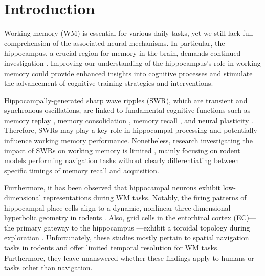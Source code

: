 \documentclass[final,3p,times,twocolumn]{elsarticle}
\begin{document}
\section{Introduction}
Working memory (WM) is essential for various daily tasks, yet we still lack full comprehension of the associated neural mechanisms. In particular, the hippocampus, a crucial region for memory in the brain, demands continued investigation \cite{scoville_loss_1957,squire_legacy_2009,boran_persistent_2019,kaminski_persistently_2017,kornblith_persistent_2017,faraut_dataset_2018,borders_hippocampus_2022,li_functional_2023,dimakopoulos_information_2022}. Improving our understanding of the hippocampus's role in working memory could provide enhanced insights into cognitive processes and stimulate the advancement of cognitive training strategies and interventions. 

\indent
Hippocampally-generated sharp wave ripples (SWR), which are transient and synchronous oscillations, are linked to fundamental cognitive functions such as memory replay \cite{wilson_reactivation_1994,nadasdy_replay_1999,lee_memory_2002,davidson_hippocampal_2009}, memory consolidation \cite{girardeau_selective_2009,ego-stengel_disruption_2010,fernandez-ruiz_long-duration_2019,kim_corticalhippocampal_2022}, memory recall \cite{wu_hippocampal_2017,norman_hippocampal_2019,norman_hippocampal_2021}, and neural plasticity \cite{behrens_induction_2005,norimoto_hippocampal_2018}. Therefore, SWRs may play a key role in hippocampal processing and potentially influence working memory performance. Nonetheless, research investigating the impact of SWRs on working memory is limited \cite{jadhav_awake_2012}, mainly focusing on rodent models performing navigation tasks without clearly differentiating between specific timings of memory recall and acquisition.

\indent
Furthermore, it has been observed that hippocampal neurons exhibit low-dimensional representations during WM tasks. Notably, the firing patterns of hippocampal place cells \cite{okeefe_hippocampus_1971,okeefe_place_1976,ekstrom_cellular_2003,kjelstrup_finite_2008,harvey_intracellular_2009,royer_control_2012} align to a dynamic, nonlinear three-dimensional hyperbolic geometry in rodents \cite{zhang_hippocampal_2022}. Also, grid cells in the entorhinal cortex (EC)—the primary gateway to the hippocampus \cite{naber_reciprocal_2001,van_strien_anatomy_2009,strange_functional_2014}—exhibit a toroidal topology during exploration \cite{gardner_toroidal_2022}. Unfortunately, these studies mostly pertain to spatial navigation tasks in rodents and offer limited temporal resolution for WM tasks. Furthermore, they leave unanswered whether these findings apply to humans or tasks other than navigation.
\end{document}
